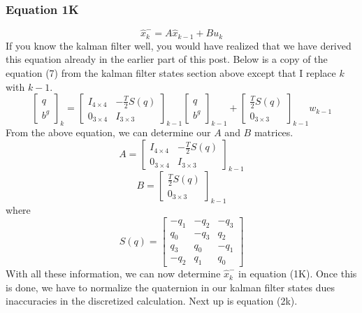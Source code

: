 \documentclass[a4paper,12pt]{book}
\begin{document}
\subsubsection{Equation 1K}
\begin{equation}
    \hat{x}_{k}^- = A\hat{x}_{k-1} + Bu_k
\end{equation}
If you know the kalman filter well, you would have realized that we have derived this equation already in the earlier part of this post. Below is a copy of the equation (7) from the kalman filter states section above except that I replace $k$ with $k-1$.
\begin{equation}
    \begin{bmatrix} q \\ b^g \end{bmatrix}_{k} = \begin{bmatrix} I_{4\times4} & - \frac{T}{2}S(q) \\ 0_{3\times4} & I_{3\times3} \end{bmatrix}_{k-1}\begin{bmatrix} q \\ b^g \end{bmatrix}_{k-1} + \begin{bmatrix} \frac{T}{2}S(q) \\ 0_{3\times3} \end{bmatrix}_{k-1}w_{k-1}
\end{equation}
From the above equation, we can determine our $A$ and $B$ matrices.
\begin{equation}
    A=\begin{bmatrix} I_{4\times4} & - \frac{T}{2}S(q) \\ 0_{3\times4} & I_{3\times3} \end{bmatrix}_{k-1}
\end{equation}
\begin{equation}
    B=\begin{bmatrix} \frac{T}{2}S(q) \\ 0_{3\times3} \end{bmatrix}_{k-1}
\end{equation}
where
\begin{equation}
    S(q)=\begin{bmatrix} -q_1 & -q_2 & -q_3 \\ q_0 & -q_3 & q_2 \\ q_3 & q_0 & -q_1 \\ -q_2 & q_1 & q_0 \end{bmatrix}
\end{equation}
With all these information, we can now determine $\hat{x}^{-}_{k}$ in equation (1K). Once this is done, we have to normalize the quaternion in our kalman filter states dues inaccuracies in the discretized calculation. Next up is equation (2k).
\end{document}
